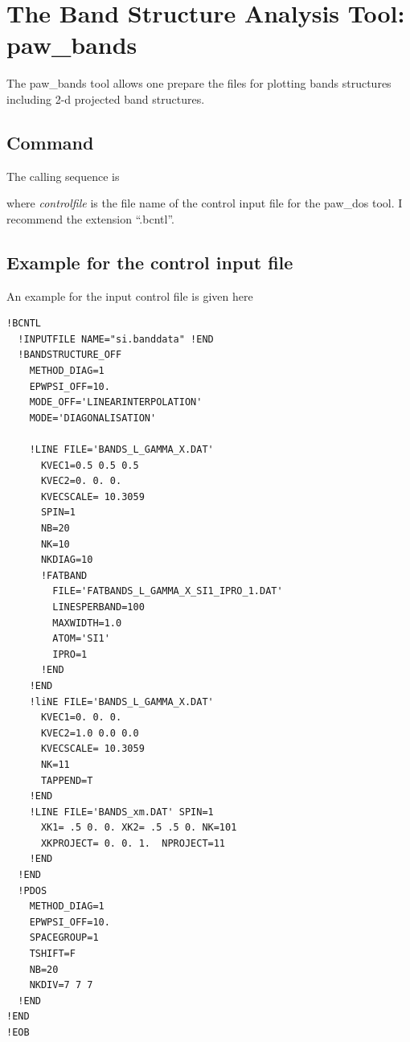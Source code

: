 \documentclass[final,12pt]{article}
\begin{document}
{{{{{{%
\newpage
\section{The Band Structure Analysis Tool: paw\_bands}
The paw\_bands tool allows one prepare the files for plotting bands
structures including 2-d projected band structures.

\subsection{Command}

The calling sequence is

\bigskip{}\bigskip

\noindent
where {\it controlfile} is the file name of the control input file for
the paw\_dos tool. I recommend the extension ``.bcntl''.

\subsection{Example for the control input file}
An example for the input control file is given here
\begin{verbatim}
!BCNTL
  !INPUTFILE NAME="si.banddata" !END
  !BANDSTRUCTURE_OFF
    METHOD_DIAG=1
    EPWPSI_OFF=10.
    MODE_OFF='LINEARINTERPOLATION'
    MODE='DIAGONALISATION'

    !LINE FILE='BANDS_L_GAMMA_X.DAT'
      KVEC1=0.5 0.5 0.5   
      KVEC2=0. 0. 0. 
      KVECSCALE= 10.3059  
      SPIN=1
      NB=20
      NK=10
      NKDIAG=10
      !FATBAND 
        FILE='FATBANDS_L_GAMMA_X_SI1_IPRO_1.DAT'
        LINESPERBAND=100
        MAXWIDTH=1.0
        ATOM='SI1'
        IPRO=1
      !END
    !END
    !liNE FILE='BANDS_L_GAMMA_X.DAT'
      KVEC1=0. 0. 0. 
      KVEC2=1.0 0.0 0.0   
      KVECSCALE= 10.3059      
      NK=11
      TAPPEND=T
    !END
    !LINE FILE='BANDS_xm.DAT' SPIN=1
      XK1= .5 0. 0. XK2= .5 .5 0. NK=101 
      XKPROJECT= 0. 0. 1.  NPROJECT=11 
    !END
  !END
  !PDOS
    METHOD_DIAG=1
    EPWPSI_OFF=10.
    SPACEGROUP=1
    TSHIFT=F
    NB=20
    NKDIV=7 7 7
  !END
!END
!EOB
\end{verbatim}

}}}}}}
\end{document}

